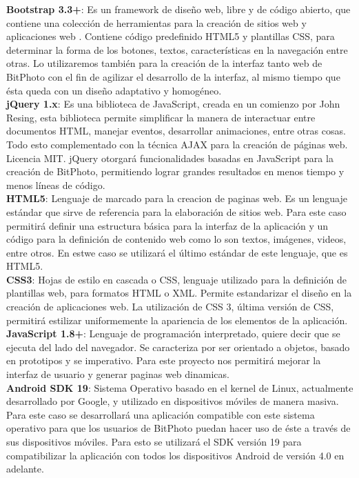 \documentclass{memoria}
\begin{document}
\textbf{Bootstrap 3.3+}: Es un framework de diseño web, libre y de código abierto, que contiene una colección de herramientas para la creación de sitios web y aplicaciones web . Contiene código predefinido HTML5 y plantillas CSS, para determinar la forma de los botones, textos, características en la navegación entre otras. Lo utilizaremos también para la creación de la interfaz tanto web de BitPhoto con el fin de agilizar el desarrollo de la interfaz, al mismo tiempo que ésta queda con un diseño adaptativo y homogéneo.\\

\textbf{jQuery 1.x}: Es una biblioteca de JavaScript, creada en un comienzo por John Resing, esta biblioteca permite simplificar la manera de interactuar entre documentos HTML, manejar eventos, desarrollar animaciones, entre otras cosas. Todo esto complementado con la técnica AJAX para la creación de páginas web. Licencia MIT. jQuery otorgará funcionalidades basadas en JavaScript para la creación de BitPhoto, permitiendo lograr grandes resultados en menos tiempo y menos líneas de código.\\

\textbf{HTML5}: Lenguaje de marcado para la creacion de paginas web. Es un lenguaje estándar que sirve de referencia para la elaboración de sitios web. Para este caso permitirá definir una estructura básica para la interfaz de la aplicación y un código para la definición de contenido web como lo son textos, imágenes, videos, entre otros. En estwe caso se utilizará el último estándar de este lenguaje, que es HTML5.\\

\textbf{CSS3}: Hojas de estilo en cascada o CSS, lenguaje utilizado para la definición de plantillas web, para formatos HTML o XML. Permite estandarizar el diseño en la creación de aplicaciones web. La utilización de CSS 3, última versión de CSS, permitirá estilizar uniformemente la apariencia de los elementos de la aplicación.\\

\textbf{JavaScript 1.8+}: Lenguaje de programación interpretado, quiere decir que se ejecuta del lado del navegador. Se caracteriza por ser orientado a objetos, basado en prototipos y se imperativo. Para este proyecto nos permitirá mejorar la interfaz de usuario y generar paginas web dinamicas.\\

\textbf{Android SDK 19}: Sistema Operativo basado en el kernel de Linux, actualmente desarrollado por Google, y utilizado en dispositivos móviles de manera masiva. Para este caso se desarrollará una aplicación compatible con este sistema operativo para que los usuarios de BitPhoto puedan hacer uso de éste a través de sus dispositivos móviles. Para esto se utilizará el SDK versión 19 para compatibilizar la aplicación con todos los dispositivos Android de versión 4.0 en adelante.\\
\end{document}
